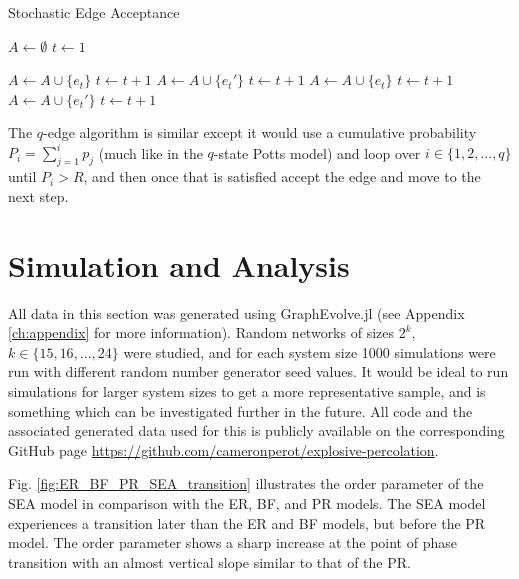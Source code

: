 \begin{algorithm}[H]
	\caption{Stochastic Edge Acceptance}\label{Stochastic-Edge-Acceptance}
	\begin{algorithmic}[1]
		\State $A \gets \emptyset$
		\State $t \gets 1$

				\State $A \gets A \cup \{e_t\}$
				\State $t \gets t+1$
				\State $A \gets A \cup \{e_t'\}$
				\State $t \gets t+1$
				\State $A \gets A \cup \{e_t\}$
				\State $t \gets t+1$
			\Else
				\State $A \gets A \cup \{e_t'\}$
				\State $t \gets t+1$
			\EndIf
		\EndWhile
	\EndProcedure
	\end{algorithmic}
\end{algorithm}

The $q$-edge algorithm is similar except it would use a cumulative probability $P_i = \sum\limits_{j=1}^{i} p_j$ (much like in the $q$-state Potts model) and loop over $i \in \{1, 2, ..., q\}$ until $P_i > R$, and then once that is satisfied accept the edge and move to the next step.



\section{Simulation and Analysis}
All data in this section was generated using GraphEvolve.jl (see Appendix \ref{ch:appendix} for more information).
Random networks of sizes $2^k$, $k \in \{15, 16, ..., 24\}$ were studied, and for each system size 1000 simulations were run with different random number generator seed values.
It would be ideal to run simulations for larger system sizes to get a more representative sample, and is something which can be investigated further in the future.
All code and the associated generated data used for this is publicly available on the corresponding GitHub page \url{https://github.com/cameronperot/explosive-percolation}.

Fig. \ref{fig:ER_BF_PR_SEA_transition} illustrates the order parameter of the SEA model in comparison with the ER, BF, and PR models.
The SEA model experiences a transition later than the ER and BF models, but before the PR model.
The order parameter shows a sharp increase at the point of phase transition with an almost vertical slope similar to that of the PR.

